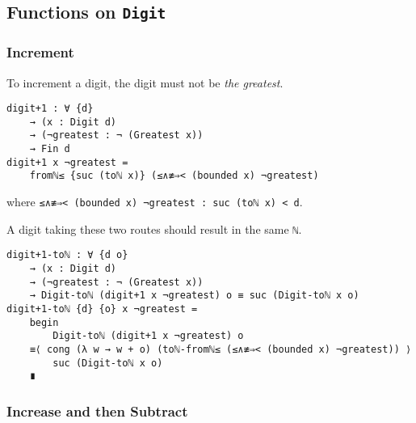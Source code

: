 \documentclass[\main/thesis.tex]{subfiles}
\begin{document}
\subsection{Functions on \lstinline|Digit|}

\subsubsection{Increment}

To increment a digit, the digit must not be \textit{the greatest}.

\begin{lstlisting}
digit+1 : ∀ {d}
    → (x : Digit d)
    → (¬greatest : ¬ (Greatest x))
    → Fin d
digit+1 x ¬greatest =
    fromℕ≤ {suc (toℕ x)} (≤∧≢⇒< (bounded x) ¬greatest)
\end{lstlisting}
%
where {\lstinline|≤∧≢⇒< (bounded x) ¬greatest : suc (toℕ x) < d|}.

\begin{center}
\end{center}

A digit taking these two routes should result in the same {{\lstinline|ℕ|}}.

\begin{lstlisting}[basicstyle=\ttfamily\scriptsize]
digit+1-toℕ : ∀ {d o}
    → (x : Digit d)
    → (¬greatest : ¬ (Greatest x))
    → Digit-toℕ (digit+1 x ¬greatest) o ≡ suc (Digit-toℕ x o)
digit+1-toℕ {d} {o} x ¬greatest =
    begin
        Digit-toℕ (digit+1 x ¬greatest) o
    ≡⟨ cong (λ w → w + o) (toℕ-fromℕ≤ (≤∧≢⇒< (bounded x) ¬greatest)) ⟩
        suc (Digit-toℕ x o)
    ∎
\end{lstlisting}

\subsubsection{Increase and then Subtract}
\end{document}
